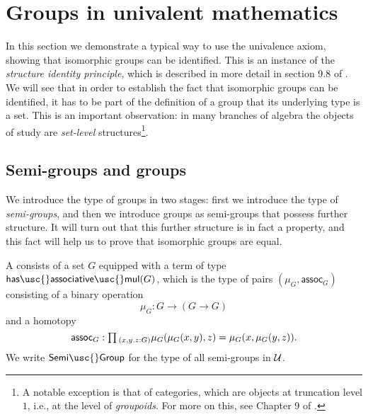 \section{Groups in univalent mathematics}

In this section we demonstrate a typical way to use the univalence axiom, showing that isomorphic groups can be identified.
This is an instance of the \emph{structure identity principle}, which is described in more detail in section 9.8 of \cite{hottbook}.
We will see that in order to establish the fact that isomorphic groups can be identified, it has to be part of the definition of a group that its underlying type is a set. This is an important observation: in many branches of algebra the objects of study are \emph{set-level} structures\footnote{A notable exception is that of categories, which are objects at truncation level $1$, i.e., at the level of \emph{groupoids}. For more on this, see Chapter 9 of \cite{hottbook}.}.

\subsection{Semi-groups and groups}
We introduce the type of groups in two stages: first we introduce the type of \emph{semi-groups}, and then we introduce groups as semi-groups that possess further structure. It will turn out that this further structure is in fact a property, and this fact will help us to prove that isomorphic groups are equal.

\begin{defn}
  A  consists of a set $G$ equipped with a term of type $\mathsf{has\usc{}associative\usc{}mul}(G)$, which is the type of pairs $(\mu_G,\mathsf{assoc}_G)$ consisting of a binary operation
  \begin{equation*}
    \mu_G : G \to (G \to G)
  \end{equation*}
  and a homotopy
  \begin{equation*}
    \mathsf{assoc}_G : \prd{x,y.z:G}\mu_G(\mu_G(x,y),z)=\mu_G(x,\mu_G(y,z)).
  \end{equation*}
  We write $\mathsf{Semi\usc{}Group}$ for the type of all semi-groups in $\mathcal{U}$.
\end{defn}

